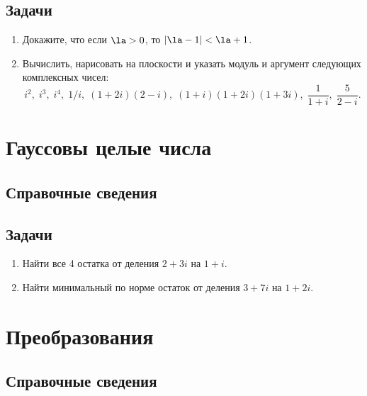 \subsection*{Задачи}


\begin{enumerate}
\item Докажите, что если $\la>0$, то $|\la-1|<\la+1$.
\item Вычислить, нарисовать на плоскости и указать модуль и аргумент следующих комплексных чисел:
$$
i^2,\;i^3,\;i^4,\;1/i,\;(1+2i)(2-i),\;(1+i)(1+2i)(1+3i),\;\frac{1}{1+i},\;\frac{5}{2-i}.
$$
\end{enumerate}


\section{Гауссовы целые числа}

\subsection*{Справочные сведения}

\subsection*{Задачи}

\begin{enumerate}
\item Найти все 4 остатка от деления $2+3i$ на $1+i$.
\item Найти минимальный по норме остаток от деления $3+7i$ на $1+2i$.
\end{enumerate}

\label{linalg}


\section{Преобразования}

\subsection*{Справочные сведения}

